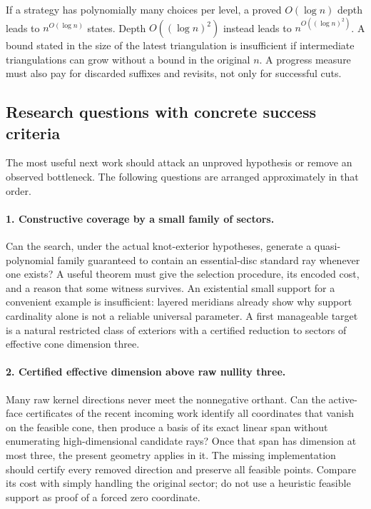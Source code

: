 If a strategy has polynomially many choices per level, a proved
\(O(\log n)\) depth leads to \(n^{O(\log n)}\) states.  Depth
\(O((\log n)^2)\) instead leads to \(n^{O((\log n)^2)}\).
A bound stated in the size of the latest triangulation is
insufficient if intermediate triangulations can grow without a
bound in the original \(n\).  A progress measure must also pay for
discarded suffixes and revisits, not only for successful cuts.

\subsection{Research questions with concrete success criteria}

The most useful next work should attack an unproved hypothesis or
remove an observed bottleneck.  The following questions are arranged
approximately in that order.

\paragraph{1. Constructive coverage by a small family of sectors.}
Can the search, under the actual knot-exterior hypotheses, generate
a quasi-polynomial family guaranteed to contain an essential-disc
standard ray whenever one exists?  A useful theorem must give the
selection procedure, its encoded cost, and a reason that some
witness survives.  An existential small support for a convenient
example is insufficient: layered meridians already show why support
cardinality alone is not a reliable universal parameter.  A first
manageable target is a natural restricted class of exteriors with
a certified reduction to sectors of effective cone dimension three.

\paragraph{2. Certified effective dimension above raw nullity three.}
Many raw kernel directions never meet the nonnegative orthant.
Can the active-face certificates of the recent incoming work
identify all coordinates that vanish on the feasible cone, then
produce a basis of its exact linear span without enumerating
high-dimensional candidate rays?  Once that span has dimension at
most three, the present geometry applies in it.  The missing
implementation should certify every removed direction and preserve
all feasible points.  Compare its cost with simply handling the
original sector; do not use a heuristic feasible support as proof
of a forced zero coordinate.

